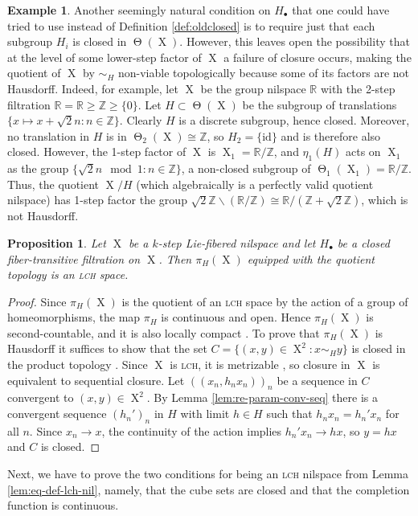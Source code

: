 \documentclass[a4paper,12pt,reqno]{amsart}
\newtheorem{proposition}[theorem]{Proposition}
\theoremstyle{definition}
\newtheorem{example}[theorem]{Example}
\def\to{\rightarrow}
\newcommand{\mb}{\mathbb}
\newcommand{\id}{\mathrm{id}}
\DeclareMathOperator{\tran}{\Theta}
\DeclareMathOperator{\ns}{X}
\begin{document}
\begin{example}
Another seemingly natural condition on $H_\bullet$ that one could have tried to use instead of Definition \ref{def:oldclosed} is to require just that each subgroup $H_i$ is closed in $\tran(\ns)$. However, this leaves open the possibility that at the level of some lower-step factor of $\ns$ a failure of closure occurs, making the quotient of $\ns$ by $\sim_H$ non-viable topologically because some of its factors are not Hausdorff. Indeed, for example, let $\ns$ be the group nilspace $\mb{R}$ with the 2-step filtration $\mb{R}=\mb{R}\ge \mb{Z}\ge \{0\}$. Let $H\subset \tran(\ns)$ be the subgroup of translations $\{ x\mapsto x+\sqrt{2}n: n\in\mb{Z}\}$. Clearly $H$ is a discrete subgroup, hence closed. Moreover, no translation in $H$ is in $\tran_2(\ns)\cong\mb{Z}$, so $H_2=\{\id\}$ and is therefore also closed. However, the 1-step factor of $\ns$ is $\ns_1 = \mb{R}/\mb{Z}$, and $\eta_1(H)$ acts on $\ns_1$ as the group $\{\sqrt{2}n\!\!\mod 1:n\in \mb{Z}\}$, a non-closed subgroup of $\tran_1(\ns_1) = \mb{R}/\mb{Z}$. Thus, the quotient $\ns/H$ (which algebraically is a perfectly valid quotient nilspace) has 1-step factor the group $\sqrt{2}\mb{Z}\backslash (\mb{R}/\mb{Z})\cong  \mb{R}/(\mb{Z}+\sqrt{2}\mb{Z})$, which is not Hausdorff.
\end{example}

\begin{proposition}\label{prop:quot-lcfr-nil}
Let $\ns$ be a $k$-step Lie-fibered nilspace and let $H_\bullet$ be a closed fiber-transitive filtration on $\ns$. Then $\pi_H(\ns)$ equipped with the quotient topology is an \textsc{lch} space.
\end{proposition}

\begin{proof}
Since $\pi_H(\ns)$ is the quotient of an \textsc{lch} space by the action of a group of homeomorphisms, the map $\pi_H$ is continuous and open. Hence $\pi_H(\ns)$ is second-countable, and it is also locally compact \cite[Ex.\ 29.3]{Mu}. To prove that $\pi_H(\ns)$ is Hausdorff it suffices to show that the set $C=\{(x,y)\in\ns^2:x\sim_H y\}$ is closed in the product topology \cite[p.\ 79, Prop.\ 8]{BourbakiGT1}. Since $\ns$ is \textsc{lch}, it is metrizable \cite[Ex.\ 32.3 and Thm.\ 34.1]{Mu}, so closure in $\ns$ is equivalent to sequential closure. Let $((x_n,h_n x_n))_n$ be a sequence in $C$ convergent to $(x,y)\in \ns^2$. By Lemma \ref{lem:re-param-conv-seq} there is a convergent sequence $(h_n')_n$ in $H$ with limit $h\in H$ such that $h_nx_n=h_n'x_n$ for all $n$. Since $x_n\to x$, the continuity of the action implies $h_n' x_n\to hx$, so $y=hx$ and $C$ is closed.
\end{proof}
\noindent Next, we have to prove the two conditions for being an \textsc{lch} nilspace from Lemma \ref{lem:eq-def-lch-nil}, namely, that the cube sets are closed and that the completion function is continuous. 
\end{document}
